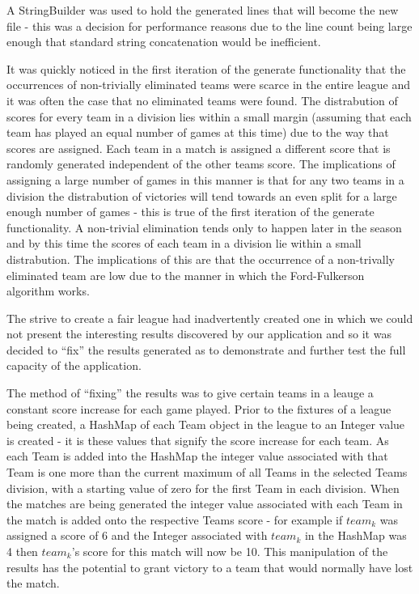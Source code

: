 A StringBuilder was used to hold the generated lines that will become
the new file - this was a decision for performance reasons due to the
line count being large enough that standard string concatenation would
be inefficient.

It was quickly noticed in the first iteration of the generate
functionality that the occurrences of non-trivially eliminated teams
were scarce in the entire league and it was often the case that no
eliminated teams were found. The distrabution of scores for every team
in a division lies within a small margin (assuming that each team has
played an equal number of games at this time) due to the way that
scores are assigned. Each team in a match is assigned a different
score that is randomly generated independent of the other teams
score. The implications of assigning a large number of games in this
manner is that for any two teams in a division the distrabution of
victories will tend towards an even split for a large enough number of
games - this is true of the first iteration of the generate
functionality. A non-trivial elimination tends only to happen later in
the season and by this time the scores of each team in a division lie
within a small distrabution. The implications of this are that the
occurrence of a non-trivally eliminated team are low due to the manner
in which the Ford-Fulkerson algorithm works.


The strive to create a fair league had inadvertently created one in
which we could not present the interesting results discovered by our
application and so it was decided to ``fix'' the results generated as
to demonstrate and further test the full capacity of the application.

The method of ``fixing'' the results was to give certain teams in a
leauge a constant score increase for each game played.
Prior to the fixtures of a league being created, a HashMap of each
Team object in the league to an Integer value is created - it is
these values that signify the score increase for each team. As each
Team is added into the HashMap the integer value associated with that
Team is one more than the current maximum of all Teams in the selected
Teams division, with a starting value of zero for the first Team in
each division. When the matches are being generated the integer value
associated with each Team in the match is added onto the respective
Teams score - for example if $team_k$ was assigned a score of 6 and the
Integer associated with $team_k$ in the HashMap was 4 then $team_k$'s
score for this match will now be 10. This manipulation of the results
has the potential to grant victory to a team that would normally have
lost the match.

